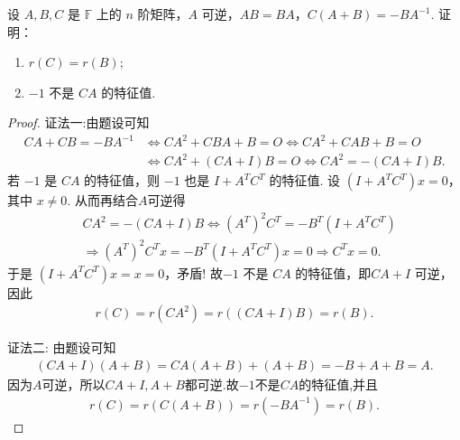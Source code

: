 \documentclass[../../main.tex]{subfiles}%
\begin{document}
\begin{example}
设 \(A,B,C\) 是 \(\mathbb{F}\) 上的 \(n\) 阶矩阵，\(A\) 可逆，\(AB=BA\)，\(C(A+B)=-BA^{-1}\). 
证明：
\begin{enumerate}[(1)]
\item \(r(C)=r(B)\);
\item \(-1\) 不是 \(CA\) 的特征值.
\end{enumerate}
\end{example}
\begin{proof}

{\color{blue}证法一:}由题设可知
\begin{align*}
CA+CB=-BA^{-1}&\Longleftrightarrow CA^2+CBA+B=O\Longleftrightarrow CA^2+CAB+B=O
\\
&\Longleftrightarrow CA^2+\left( CA+I \right) B=O\Longleftrightarrow CA^2=-\left( CA+I \right) B.
\end{align*}
若 \(-1\) 是 \(CA\) 的特征值，则 \(-1\) 也是 \(I+A^TC^T\) 的特征值. 设 \((I+A^TC^T)x=0\)，其中 \(x\neq 0\). 从而再结合$A$可逆得
\begin{align*}
&CA^2=-\left( CA+I \right) B\Longleftrightarrow \left( A^T \right) ^2C^T=-B^T\left( I+A^TC^T \right) 
\\
&\Longrightarrow \left( A^T \right) ^2C^Tx=-B^T\left( I+A^TC^T \right) x=0\Longrightarrow C^Tx=0.
\end{align*}
于是 \((I+A^TC^T)x=x=0\)，矛盾! 故\(-1\) 不是 \(CA\) 的特征值，即\(CA+I\) 可逆，因此
\begin{align*}
r\left( C \right) =r\left( CA^2 \right) =r\left( \left( CA+I \right) B \right) =r\left( B \right) .
\end{align*}

{\color{blue}证法二:} 由题设可知
\begin{align*}
(CA+I)(A+B) = CA(A+B) + (A+B) = -B + A + B = A.
\end{align*}
因为$A$可逆，所以$CA+I,A+B$都可逆.故$-1$不是$CA$的特征值,并且
\begin{align*}
r(C)=r(C(A+B))=r(-BA^{-1})=r(B).
\end{align*}
\end{proof}
\end{document}

